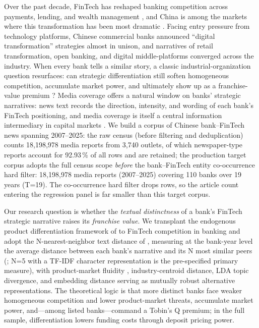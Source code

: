 Over the past decade, FinTech has reshaped banking competition across
payments, lending, and wealth management
\parencite{berg2022fintechlending,parlour2022payments,vives2025lendercompetition},
and China is among the markets where this transformation has been most
dramatic \parencite{hau2024fintechcredit,cheng2020bankfintech}. Facing
entry pressure from technology platforms, Chinese commercial banks
announced ``digital transformation'' strategies almost in unison, and
narratives of retail transformation, open banking, and digital
middle-platforms converged across the industry. When every bank tells
a similar story, a classic industrial-organization question resurfaces:
can strategic differentiation still soften homogeneous competition,
accumulate market power, and ultimately show up as a franchise-value
premium \parencite{hoberg2016tnic,drechsler2026franchise}? Media
coverage offers a natural window on banks' strategic narratives: news
text records the direction, intensity, and wording of each bank's
FinTech positioning, and media coverage is itself a central
information intermediary in capital markets
\parencite{fang2009media,you2018pen}. We build a corpus of Chinese
bank--FinTech news spanning 2007--2025: the raw census (before
filtering and deduplication) counts 18{,}198{,}978 media reports from
3{,}740 outlets, of which newspaper-type reports account for
92.93\,\% of all rows and are retained; the production target
corpus adopts the full census scope \emph{before} the bank--FinTech
entity co-occurrence hard filter: 18{,}198{,}978 media reports
(2007--2025) covering 110 banks over 19 years (T=19). The
co-occurrence hard filter drops rows, so the article count entering
the regression panel is far smaller than this target corpus.

Our research question is whether the \emph{textual distinctness} of a
bank's FinTech strategic narrative raises its \emph{franchise value}.
We transplant the endogenous product differentiation framework of
\textcite{hoberg2016tnic} to FinTech competition in banking and adopt
the N-nearest-neighbor text distance of \textcite{guzman2023strategy},
measuring at the bank-year level the average distance between each
bank's narrative and its N most similar peers (;
N=5 with a TF-IDF character representation is the pre-specified
primary measure), with product-market fluidity
\parencite{hoberg2014fluidity}, industry-centroid distance, LDA topic
divergence, and embedding distance serving as mutually robust
alternative representations. The theoretical logic is that more
distinct banks face weaker homogeneous competition and lower
product-market threats, accumulate market power, and---among listed
banks---command a Tobin's Q premium; in the full sample,
differentiation lowers funding costs through deposit pricing power.

